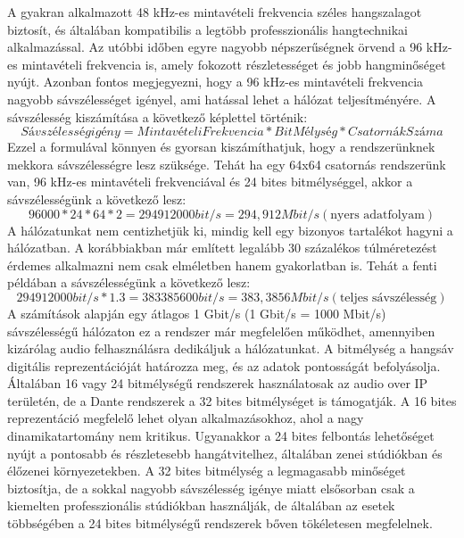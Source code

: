 A gyakran alkalmazott 48 kHz-es mintavételi frekvencia széles hangszalagot biztosít, és 
általában kompatibilis a legtöbb professzionális hangtechnikai alkalmazással. 
Az utóbbi időben egyre nagyobb népszerűségnek örvend a 96 kHz-es mintavételi frekvencia is, amely fokozott 
részletességet és jobb hangminőséget nyújt. Azonban fontos megjegyezni, hogy a 96 kHz-es mintavételi 
frekvencia nagyobb sávszélességet igényel, ami hatással lehet a hálózat teljesítményére.
A sávszélesség kiszámítása a következő képlettel történik:
\begin{equation}
	\label{eq:sávszélesség}
	Sávszélesség igény = MintavételiFrekvencia * BitMélység * CsatornákSzáma
\end{equation}
Ezzel a formulával könnyen és gyorsan kiszámíthatjuk, hogy a rendszerünknek mekkora sávszélességre lesz szüksége.
Tehát ha egy 64x64 csatornás rendszerünk van, 96 kHz-es mintavételi frekvenciával és 24 bites bitmélységgel,
akkor a sávszélességünk a következő lesz:
\begin{equation}
	\label{eq:sávszélesség}
	96000 * 24 * 64 * 2 = 294912000 bit/s = 294,912 Mbit/s (\text{nyers adatfolyam})
\end{equation}
A hálózatunkat nem centizhetjük ki, mindig kell egy bizonyos tartalékot hagyni a hálózatban. A korábbiakban már említett
legalább 30 százalékos túlméretezést érdemes alkalmazni nem csak elméletben hanem gyakorlatban is. 
Tehát a fenti példában a sávszélességünk a következő lesz:
\begin{equation}
	\label{eq:teljes-sávszélesség}
	294912000 bit/s * 1.3 = 383385600 bit/s = 383,3856 Mbit/s (\text{teljes sávszélesség})
\end{equation}
A számítások alapján egy átlagos 1 Gbit/s (1 Gbit/s = 1000 Mbit/s) sávszélességű hálózaton ez a rendszer már megfelelően működhet,
amennyiben kizárólag audio felhasználásra dedikáljuk a hálózatunkat.
A bitmélység a hangsáv digitális reprezentációját határozza meg, és az adatok pontosságát befolyásolja.
Általában 16 vagy 24 bitmélységű rendszerek használatosak az audio over IP területén, de a Dante rendszerek a 
32 bites bitmélységet is támogatják. A 16 bites reprezentáció megfelelő lehet olyan alkalmazásokhoz, ahol a nagy
dinamikatartomány nem kritikus. Ugyanakkor a 24 bites felbontás lehetőséget nyújt a pontosabb és részletesebb hangátvitelhez,
általában zenei stúdiókban és élőzenei környezetekben. 
A 32 bites bitmélység a legmagasabb minőséget biztosítja, de a sokkal nagyobb sávszélesség igénye miatt elsősorban csak
a kiemelten professzionális stúdiókban használják, de általában az esetek többségében
a 24 bites bitmélységű rendszerek bőven tökéletesen megfelelnek.
